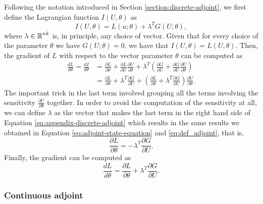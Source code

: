 Following the notation introduced in Section \ref{section:discrete-adjoint}, we first define the Lagrangian function $I(U, \theta)$ as 
\begin{equation}
    I(U, \theta) = L(u; \theta) + \lambda^T G(U; \theta),
\end{equation}
where $\lambda \in \operatorname{\mathbb{R}}^{nk}$ is, in principle, any choice of vector. 
Given that for every choice of the parameter $\theta$ we have $G(U; \theta) = 0$, we have that $I(U, \theta) = L(U, \theta)$.
Then, the gradient of $L$ with respect to the vector parameter $\theta$ can be computed as 
\begin{align}
    \frac{dL}{d\theta}
    = 
    \frac{dI}{d\theta}
    &= 
    \frac{\partial L}{\partial \theta} + \frac{\partial L}{\partial U} \frac{\partial U}{\partial \theta}
    + 
    \lambda^T
    \left( \frac{\partial G}{\partial U} + \frac{\partial G}{\partial U} \frac{\partial U}{\partial \theta} \right) \nonumber
    \\ 
    &= 
    \frac{\partial L}{\partial \theta} + \lambda^T \frac{\partial G}{\partial U} 
    + 
    \left( \frac{\partial L}{\partial \theta} + \lambda^T \frac{\partial G}{\partial U} \right) \frac{\partial U}{\partial \theta}. \label{eq:appendix-discrete-adjoint}
\end{align}
The important trick in the last term involved grouping all the terms involving the sensitivity $\frac{\partial U}{\partial \theta}$ together. 
In order to avoid the computation of the sensitivity at all, we can define $\lambda$ as the vector that makes the last term in the right hand side of Equation \eqref{eq:appendix-discrete-adjoint} which results in the same results we obtained in Equation \eqref{eq:adjoint-state-equation} and \eqref{eq:def_adjoint}, that is, 
\begin{equation}
    \frac{\partial L}{\partial \theta} = - \lambda^T \frac{\partial G}{\partial U}.
\end{equation}
Finally, the gradient can be computed as 
\begin{equation}
    \frac{dL}{d\theta} 
    = 
    \frac{\partial L}{\partial \theta} + \lambda^T \frac{\partial G}{\partial U} .
\end{equation}

\subsubsection{Continuous adjoint}


